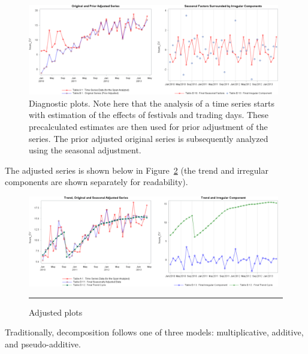 \begin{figure}[t]
\centering
\includegraphics[width=0.98\textwidth]{Images/DiffComponents.png}
\caption[Diagnostic plots.]{Diagnostic plots. Note here that the analysis of a time series starts with estimation of the effects of festivals and trading days. These precalculated
estimates are then used for prior adjustment of the series. The prior adjusted original series is
subsequently analyzed using the seasonal adjustment.}
\label{fig:diff}
\end{figure}
The adjusted series is shown below in Figure~\ref{fig:adjusted} (the trend and irregular components are shown separately for readability).
\begin{figure}[t]
\centering
\includegraphics[width=0.98\textwidth]{Images/adjustedplot.png}
\caption{Adjusted plots}\hrule
\label{fig:adjusted}
\end{figure}
\newl Traditionally, decomposition follows one of three models: multiplicative, additive, and pseudo-additive. 

